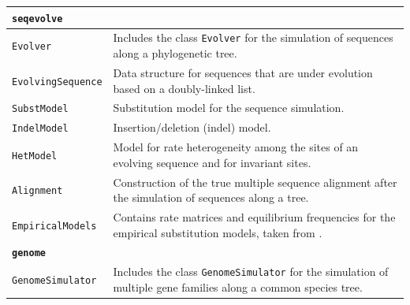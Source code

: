 \documentclass[hidelinks,11pt]{article}
\begin{document}
{\begin{longtable}{| p{4.0cm} | p{10cm} |}
	\hline
	\multicolumn{2}{|l|}{\textbf{\texttt{seqevolve}}}\\
	\hline
	\texttt{Evolver} &
	Includes the class \texttt{Evolver} for the simulation of sequences along a phylogenetic tree. \\
	\texttt{EvolvingSequence} &
	Data structure for sequences that are under evolution based on a doubly-linked list. \\
	\texttt{SubstModel} &
	Substitution model for the sequence simulation. \\
	\texttt{IndelModel} &
	Insertion/deletion (indel) model. \\
	\texttt{HetModel} &
	Model for rate heterogeneity among the sites of an evolving sequence and for invariant sites. \\
	\texttt{Alignment} &
	Construction of the true multiple sequence alignment after the simulation of sequences along a tree. \\
	\texttt{EmpiricalModels} &
	Contains rate matrices and equilibrium frequencies for the empirical 
	substitution models, taken from \citep{criscuolo}. \\
  \hline
  \multicolumn{2}{|l|}{\textbf{\texttt{genome}}}\\
  \hline
  \texttt{GenomeSimulator} &
  Includes the class \texttt{GenomeSimulator} for the simulation of multiple 
  gene families along a common species tree. \\

\end{longtable}}
\end{document}
